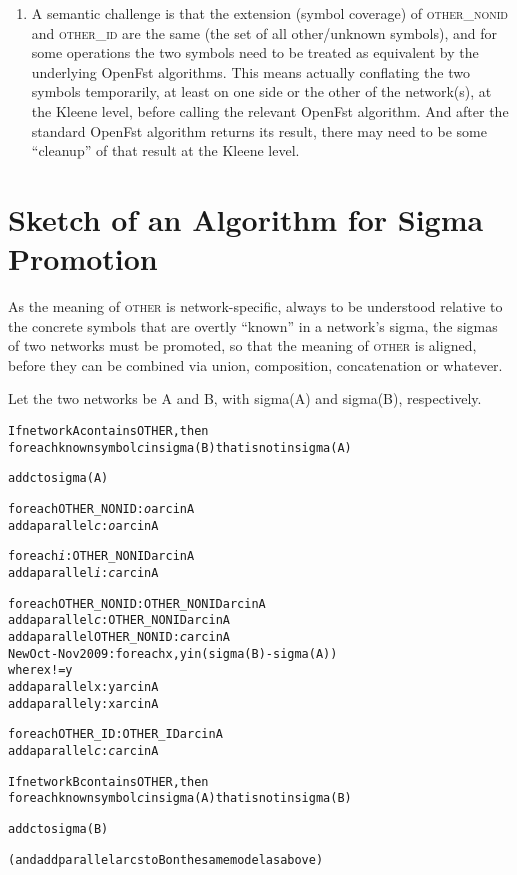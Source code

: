 \documentclass[letterpaper,11pt]{article}
\providecommand{\acro}{}\renewcommand{\acro}{\textsc}
\begin{document}
\begin{enumerate}
\item
A semantic challenge is that the extension (symbol coverage) of
\acro{other\_nonid} and \acro{other\_id} are the same (the set of all
other/unknown symbols), and for some operations the two symbols need
to be treated as equivalent by the underlying OpenFst algorithms. This means actually conflating the two symbols temporarily, at least
on one side or the other of the network(s), at the Kleene level, before calling the relevant OpenFst
algorithm.  And after the standard OpenFst algorithm returns its result, there may need to be some
``cleanup'' of that result at the Kleene level.

\end{enumerate}

\section{Sketch of an Algorithm for Sigma Promotion}

As the meaning of \acro{other} is network-specific, always to be
understood relative to the concrete symbols that are overtly
``known'' in a network's sigma, the sigmas of two networks must be promoted,
so that the meaning of \acro{other} is aligned, before they can be combined
via union, composition, concatenation or whatever.  

\begin{samepage}
Let the two networks be A and B, with sigma(A) and sigma(B),
respectively.  

\begin{alltt}
{\footnotesize
If network A contains OTHER, then
  for each known symbol \emph{c} in sigma(B) that is not in sigma(A)

    add c to sigma(A)

    for each OTHER_NONID:\emph{o} arc in A
      add a parallel \emph{c}:\emph{o} arc in A

    for each \emph{i}:OTHER_NONID arc in A
      add a parallel \emph{i}:\emph{c} arc in A

    for each OTHER_NONID:OTHER_NONID arc in A
      add a parallel \emph{c}:OTHER_NONID arc in A
      add a parallel OTHER_NONID:\emph{c} arc in A
	  New Oct-Nov 2009: for each x, y in (sigma(B) - sigma(A))
	  	where x != y
		add a parallel x:y arc in A
		add a parallel y:x arc in A

    for each OTHER_ID:OTHER_ID arc in A
      add a parallel \emph{c}:\emph{c} arc in A

If network B contains OTHER, then
  for each known symbol \emph{c} in sigma(A) that is not in sigma(B)

    add c to sigma(B)

    (and add parallel arcs to B on the same model as above)
\normalsize}
\end{alltt}
\end{samepage}
\end{document}
